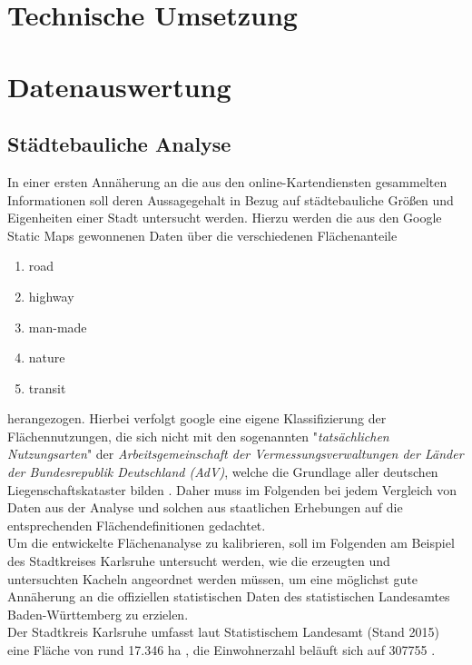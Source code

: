 \documentclass[12pt,a4paper]{scrartcl}
\begin{document}
\newpage  
\section{Technische Umsetzung}


\newpage
\section{Datenauswertung}

\subsection{Städtebauliche Analyse}

In einer ersten Annäherung an die aus den online-Kartendiensten gesammelten Informationen soll deren Aussagegehalt in Bezug auf städtebauliche Größen und Eigenheiten einer Stadt untersucht werden. Hierzu werden die aus den Google Static Maps gewonnenen Daten über die verschiedenen Flächenanteile 
\begin{enumerate}
\item road
\item highway
\item man-made
\item nature
\item transit
\end{enumerate}
herangezogen. Hierbei verfolgt google eine eigene Klassifizierung der Flächennutzungen, die sich nicht mit den sogenannten "\textit{tatsächlichen Nutzungsarten}" der  \textit{Arbeitsgemeinschaft der Vermessungsverwaltungen der Länder der Bundesrepublik Deutschland (AdV)}, welche die Grundlage aller deutschen Liegenschaftskataster bilden \cite{advnutz} . Daher muss im Folgenden bei jedem Vergleich von Daten aus der Analyse und solchen aus staatlichen Erhebungen auf die entsprechenden Flächendefinitionen gedachtet.\\
\newline
Um die entwickelte Flächenanalyse zu kalibrieren, soll im Folgenden am Beispiel des Stadtkreises Karlsruhe untersucht werden, wie die erzeugten und untersuchten Kacheln angeordnet werden müssen, um eine möglichst gute Annäherung an die offiziellen statistischen Daten des statistischen Landesamtes  Baden-Württemberg \cite{StatBaWu_Flaeche} zu erzielen.\\
\newline
Der Stadtkreis Karlsruhe umfasst laut Statistischem Landesamt (Stand 2015) eine Fläche von rund \num{17.346} \si{\hectare} \cite{StatBaWu_Flaeche}, die Einwohnerzahl beläuft sich auf \num{307755} \cite{StatBaWu_Einw}. 
\end{document}
